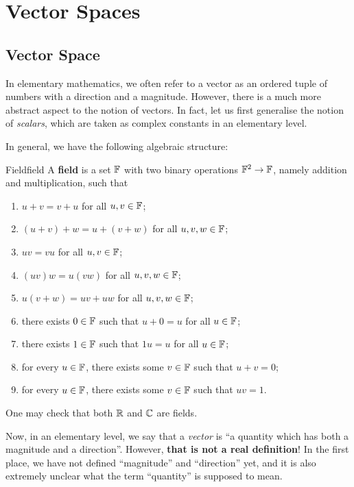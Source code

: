 \documentclass[math, code]{amznotes}
\theoremstyle{remark}
\begin{document}
\tableofcontents

\chapter{Vector Spaces}
\section{Vector Space}
In elementary mathematics, we often refer to a vector as an ordered tuple of numbers with a direction and a magnitude. However, there is a much more abstract aspect to the notion of vectors. In fact, let us first generalise the notion of \textit{scalars}, which are taken as complex constants in an elementary level. 

In general, we have the following algebraic structure:
\begin{dfnbox}{Field}{field}
    A {\color{red} \textbf{field}} is a set $\mathbb{F}$ with two binary operations $\mathbb{F}^2 \to \mathbb{F}$, namely addition and multiplication, such that
    \begin{enumerate}
        \item $u + v = v + u$ for all $u, v \in \mathbb{F}$;
        \item $(u + v) + w = u + (v + w)$ for all $u, v, w \in \mathbb{F}$;
        \item $uv = vu$ for all $u, v \in \mathbb{F}$;
        \item $(uv)w = u(vw)$ for all $u, v, w \in \mathbb{F}$;
        \item $u(v + w) = uv + uw$ for all $u, v, w \in \mathbb{F}$;
        \item there exists $0 \in \mathbb{F}$ such that $u + 0 = u$ for all $u \in \mathbb{F}$;
        \item there exists $1 \in \mathbb{F}$ such that $1u = u$ for all $u \in \mathbb{F}$;
        \item for every $u \in \mathbb{F}$, there exists some $v \in \mathbb{F}$ such that $u + v = 0$;
        \item for every $u \in \mathbb{F}$, there exists some $v \in \mathbb{F}$ such that $uv = 1$.
    \end{enumerate}
\end{dfnbox}
One may check that both $\mathbb{R}$ and $\mathbb{C}$ are fields. 

Now, in an elementary level, we say that a \textit{vector} is ``a quantity which has both a magnitude and a direction''. However, \textbf{that is not a real definition}! In the first place, we have not defined ``magnitude'' and ``direction'' yet, and it is also extremely unclear what the term ``quantity'' is supposed to mean. 
\end{document}
